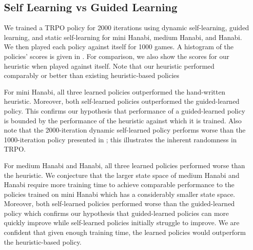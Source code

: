 \subsection{Self Learning vs Guided Learning}
We trained a TRPO policy for 2000 iterations using dynamic self-learning,
guided learning, and static self-learning for mini Hanabi, medium Hanabi, and
Hanabi. We then played each policy against itself for 1000 games. A histogram
of the policies' scores is given in . For comparison, we also show
the scores for our heuristic when played against itself. Note that our
heuristic performed comparably or better than existing heuristic-based
policies~\cite{osawa2015solving,walton2017evaluating}

For mini Hanabi, all three learned policies outperformed the hand-written
heuristic. Moreover, both self-learned policies outperformed the guided-learned
policy. This confirms our hypothesis that performance of a guided-learned
policy is bounded by the performance of the heuristic against which it is
trained. Also note that the 2000-iteration dynamic self-learned policy performs
worse than the 1000-iteration policy presented in ; this
illustrates the inherent randomness in TRPO.

For medium Hanabi and Hanabi, all three learned policies performed worse than
the heuristic. We conjecture that the larger state space of medium Hanabi and
Hanabi require more training time to achieve comparable performance to the
policies trained on mini Hanabi which has a considerably smaller state space.
Moreover, both self-learned policies performed worse than the guided-learned
policy which confirms our hypothesis that guided-learned policies can more
quickly improve while self-learned policies initially struggle to improve. We
are confident that given enough training time, the learned policies would
outperform the heuristic-based policy.

